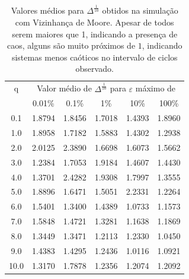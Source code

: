 \documentclass[
	12pt,				%
	openright,			%
	twoside,			%
	a4paper,			%
	english,			%
	french,				%
	spanish,			%
	brazil				%
	]{abntex2}
\begin{document}
\begin{table}[h]
  \centering
  \caption{Valores médios para $\Delta^\frac{1}{10}$ obtidos na simulação com Vizinhança de Moore. Apesar de todos serem maiores que 1, indicando a presença de caos, alguns são muito próximos de $1$, indicando sistemas menos caóticos no intervalo de ciclos observado.}
  \label{tab:mediaDeltaMoore}
  \begin{tabular}{c ccccc}
    \toprule
    q & \multicolumn{5}{c}{Valor médio de $\Delta^\frac{1}{10}$ para $\varepsilon$ máximo de}\\
     & 0.01\% & 0.1\% & 1\% & 10\% & 100\%\\\midrule\midrule
    0.1 & 1.8794	& 1.8456	& 1.7018	& 1.4393	& 1.8960\\
    1.0 & 1.8958	& 1.7182	& 1.5883	& 1.4302	& 1.2938\\
    2.0 & 2.0125	& 2.3890	& 1.6698	& 1.6073	& 1.5662\\
    3.0 & 1.2384	& 1.7053	& 1.9184	& 1.4607	& 1.4430\\
    4.0 & 1.3701	& 2.4282	& 1.9308	& 1.7997	& 1.3555\\
    5.0 & 1.8896	& 1.6471	& 1.5051	& 2.2331	& 1.2264\\
    6.0 & 1.5401	& 1.3400	& 1.4389	& 1.0733	& 1.1573\\
    7.0 & 1.5848	& 1.4721	& 1.3281	& 1.1638	& 1.1869\\
    8.0 & 1.3449	& 1.3471	& 1.2113	& 1.2330	& 1.0450\\
    9.0 & 1.4383	& 1.4295	& 1.2436	& 1.0116	& 1.0921\\
    10.0& 1.3170	& 1.7878	& 1.2356	& 1.2074	& 1.2092\\\bottomrule
  \end{tabular}
\end{table}
\end{document}
